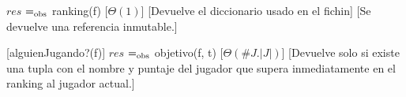 \documentclass[10pt,a4paper]{article}
\begin{document}
\begin{Interfaz}
    
    {$res$ $=_{\mathrm{obs}}$ ranking(f)}%
    [$\Theta(1)$]%
    [Devuelve el diccionario usado en el fichin]%
    [Se devuelve una referencia inmutable.]
    
    
    [alguienJugando?(f)]
    {$res$ $=_{\mathrm{obs}}$ objetivo(f, t)}%
    [$\Theta(\# J.|J|)$]%
    [Devuelve solo si existe una tupla con el nombre y puntaje del jugador que supera inmediatamente en el ranking al jugador actual.]%
    
    
  \end{Interfaz}



\end{document}
